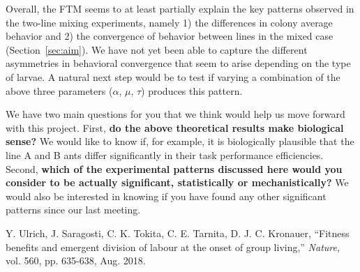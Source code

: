 \documentclass[11pt]{article}
\begin{document}
Overall, the FTM seems to at least partially explain the key patterns observed in the two-line mixing experiments, namely 1) the differences in colony average behavior and 2) the convergence of behavior between lines in the mixed case (Section~\ref{sec:aim}). We have not yet been able to capture the different asymmetries in behavioral convergence that seem to arise  depending on the type of larvae. A natural next step would be to test if varying a combination of the above three parameters ($\alpha$, $\mu$, $\tau$) produces this pattern.

We have two main questions for you that we think would help us move forward with this project. First, \textbf{do the above theoretical results make biological sense?} We would like to know if, for example, it is biologically plausible that the line A and B ants differ significantly in their task performance efficiencies. Second, \textbf{which of the experimental patterns discussed here would you consider to be actually significant, statistically or mechanistically?} We would also be interested in knowing if you have found any other significant patterns since our last meeting.

\begin{thebibliography}{99}

 Y. Ulrich, J. Saragosti, C. K. Tokita, C. E. Tarnita, D. J. C. Kronauer, ``Fitness benefits and emergent division of labour at the onset of group living,'' \textit{Nature}, vol. 560, pp. 635-638, Aug. 2018.

\end{thebibliography}
\end{document}
